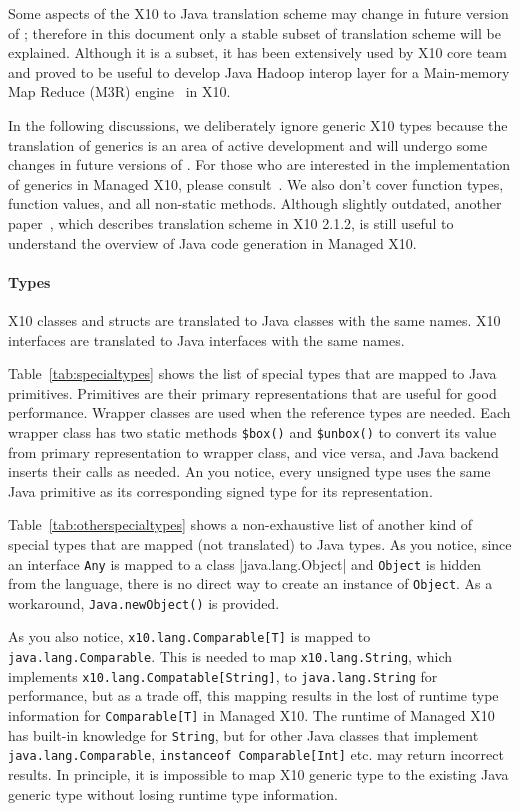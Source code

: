 Some aspects of the X10 to Java translation scheme may change in
future version of \Xten{}; therefore in this document only a stable
subset of translation scheme will be explained.  Although it is a
subset, it has been extensively used by X10 core team and proved to be
useful to develop Java Hadoop interop layer for a Main-memory Map
Reduce (M3R) engine~\cite{Shinnar12M3R} in X10.

In the following discussions, we deliberately ignore generic X10
types because the translation of generics is an area of active
development and will undergo some changes in future versions of \Xten{}.
For those who are interested in the implementation of generics
in Managed X10, please consult~\cite{TakeuchiX1012}.  We also don't
cover function types, function values, and all non-static methods.
Although slightly outdated, another paper~\cite{TakeuchiX1011}, which
describes translation scheme in X10 2.1.2, is still useful to
understand the overview of Java code generation in Managed X10.


\paragraph{Types}

X10 classes and structs are translated to Java classes with the same
names.  X10 interfaces are translated to Java interfaces with the same
names.

Table~\ref{tab:specialtypes} shows the list of special types that are
mapped to Java primitives.  Primitives are their primary
representations that are useful for good performance.  Wrapper classes
are used when the reference types are needed.  Each wrapper class has
two static methods \verb|$box()| and \verb|$unbox()| to convert its
value from primary representation to wrapper class, and vice versa,
and Java backend inserts their calls as needed.  An you notice, every
unsigned type uses the same Java primitive as its corresponding signed
type for its representation.

Table~\ref{tab:otherspecialtypes} shows a non-exhaustive list of
another kind of special types that are mapped (not translated) to Java
types.  As you notice, since an interface \verb|Any| is mapped to a
class |java.lang.Object| and \verb|Object| is hidden from the
language, there is no direct way to create an instance of
\verb|Object|. As a workaround, \verb|Java.newObject()| is provided.

As you also notice, \verb|x10.lang.Comparable[T]| is mapped to \verb|java.lang.Comparable|.
This is needed to map \verb|x10.lang.String|, which implements \verb|x10.lang.Compatable[String]|, to \verb|java.lang.String| for performance, but as a trade off, this mapping results in the lost of runtime type information for \verb|Comparable[T]| in Managed X10.
The runtime of Managed X10 has built-in knowledge for \verb|String|, but for other Java classes that implement \verb|java.lang.Comparable|, \verb|instanceof Comparable[Int]| etc. may return incorrect results.
In principle, it is impossible to map X10 generic type to the existing Java generic type without losing runtime type information.

